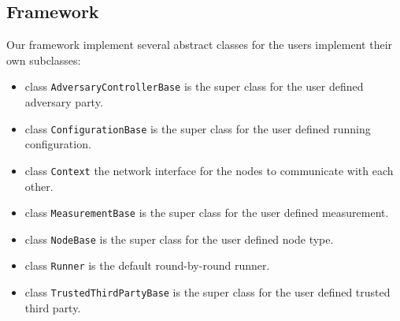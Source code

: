 \documentclass[
10pt, %
a4paper, %
oneside, %
headinclude,footinclude, %
BCOR5mm, %
]{scrartcl}
\begin{document}
\subsection{Framework}
Our framework implement several abstract classes for the users implement their own subclasses:
\begin{itemize}
	\item class \verb|AdversaryControllerBase| is the super class for the user defined adversary party.
	\item class \verb|ConfigurationBase| is the super class for the user defined running configuration.
	\item class \verb|Context| the network interface for the nodes to communicate with each other.
	\item class \verb|MeasurementBase| is the super class for the user defined measurement.
	\item class \verb|NodeBase| is the super class for the user defined node type.
	\item class \verb|Runner| is the default round-by-round runner.
	\item class \verb|TrustedThirdPartyBase| is the super class for the user defined trusted third party. 
\end{itemize}
\end{document}
